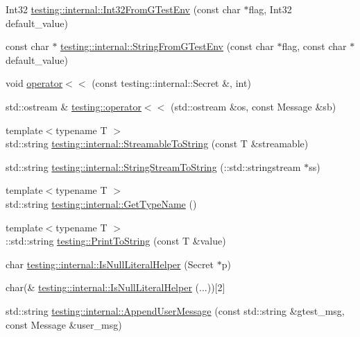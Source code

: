 \begin{DoxyCompactItemize}
\item 
Int32 \hyperlink{namespacetesting_1_1internal_ac2ea500678b361ecd2c03e4b02bb2ccf}{testing\-::internal\-::\-Int32\-From\-G\-Test\-Env} (const char $\ast$flag, Int32 default\-\_\-value)
\item 
const char $\ast$ \hyperlink{namespacetesting_1_1internal_a0967cbf18fb1594f82512d8d822aba21}{testing\-::internal\-::\-String\-From\-G\-Test\-Env} (const char $\ast$flag, const char $\ast$default\-\_\-value)
\item 
void \hyperlink{fused-src_2gtest_2gtest_8h_ae8f0c86e5c506587b62315e24a918563}{operator$<$$<$} (const testing\-::internal\-::\-Secret \&, int)
\item 
std\-::ostream \& \hyperlink{namespacetesting_a2d038049296f23fb404311f974788cd3}{testing\-::operator$<$$<$} (std\-::ostream \&os, const Message \&sb)
\item 
{\footnotesize template$<$typename T $>$ }\\std\-::string \hyperlink{namespacetesting_1_1internal_aad4beed95d0846e6ffc5da0978ef3bb9}{testing\-::internal\-::\-Streamable\-To\-String} (const T \&streamable)
\item 
std\-::string \hyperlink{namespacetesting_1_1internal_a1c063cdfa8269116167e71b477266381}{testing\-::internal\-::\-String\-Stream\-To\-String} (\-::std\-::stringstream $\ast$ss)
\item 
{\footnotesize template$<$typename T $>$ }\\std\-::string \hyperlink{namespacetesting_1_1internal_a635606b4731f843c86ec8ca51cab83a1}{testing\-::internal\-::\-Get\-Type\-Name} ()
\item 
{\footnotesize template$<$typename T $>$ }\\\-::std\-::string \hyperlink{namespacetesting_aa5717bb1144edd1d262d310ba70c82ed}{testing\-::\-Print\-To\-String} (const T \&value)
\item 
char \hyperlink{namespacetesting_1_1internal_afb0731ba39ffef1fa1730ac0699c9025}{testing\-::internal\-::\-Is\-Null\-Literal\-Helper} (Secret $\ast$p)
\item 
char(\& \hyperlink{namespacetesting_1_1internal_ab53ecfa1632a871ce7c692d722a75a57}{testing\-::internal\-::\-Is\-Null\-Literal\-Helper} (...))\mbox{[}2\mbox{]}
\item 
std\-::string \hyperlink{namespacetesting_1_1internal_ae475a090bca903bb222dd389eb189166}{testing\-::internal\-::\-Append\-User\-Message} (const std\-::string \&gtest\-\_\-msg, const Message \&user\-\_\-msg)
\item 

\end{DoxyCompactItemize}
